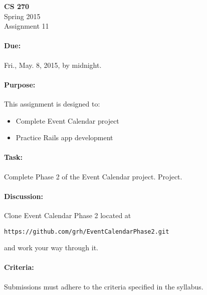 \documentclass[11pt]{article}
\begin{document}
    \thispagestyle{empty}

    \begin{center}

        \large\textbf{CS 270} \\
        Spring 2015 \\
        Assignment 11 \\

    \end{center}

    \paragraph{Due:} Fri., May. 8, 2015, by midnight.

    \paragraph{Purpose:} This assignment is designed to:

        \begin{itemize}

            \item Complete Event Calendar project

            \item Practice Rails app development

        \end{itemize}

    \paragraph{Task:} Complete Phase 2 of the Event Calendar project.
    Project.
    
    \paragraph{Discussion:} Clone Event Calendar Phase 2 located at

    \begin{center}

            \texttt{https://github.com/grh/EventCalendarPhase2.git} 
            
    \end{center}
    
    and work your way through it.

    \paragraph{Criteria:} Submissions must adhere to the criteria
    specified in the syllabus.
\end{document}
